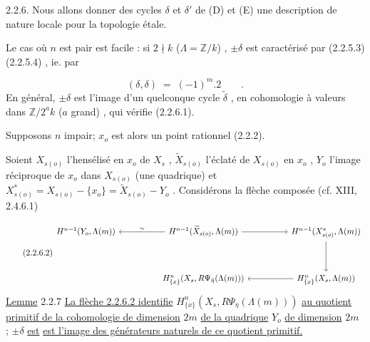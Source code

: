2.2.6. Nous allons donner des cycles  $\delta$  et  $\delta'$  de  (D) et (E) une description de nature locale pour la topologie étale.

Le cas où  $n$  est pair est facile : si  $2 \nmid k$  ($\Lambda = \mathbb{Z}/k$)  ,  $\pm \delta$  est caractérisé par (2.2.5.3) (2.2.5.4) , ie. par

\begin{equation}\tag{2.2.6.1}
(\delta,\delta) \;=\; (-1)^{m}.2 \qquad .
\end{equation}
En général,  $\pm \delta$  est l'image d'un quelconque cycle  $\widetilde{\delta}$ , en cohomologie à valeurs dans  $\mathbb{Z}/2^{a}k$  ($a$  grand) , qui vérifie (2.2.6.1).

Supposons  $n$  impair; $x_o$  est alors un point rationnel (2.2.2).

Soient  $X_{s(o)}$  l'hensélisé en  $x_o$  de  $X_s$ ,  $\widetilde{X}_{s(o)}$  l'éclaté de  $X_{s(o)}$  en  $x_o$ ,  $Y_o$  l'image réciproque de  $x_o$  dans  $X_{s(o)}$  (une quadrique) et  $X^{*}_{s(o)} = X_{s(o)} - \{x_o\} = \widetilde{X}_{s(o)} - Y_o$ . Considérons la flèche composée  (cf. XIII, 2.4.6.1)

\begin{equation}\tag{2.2.6.2}
\begin{tikzcd}[column sep=huge, row sep=huge]
H^{n-1}(Y_o,\Lambda(m)) & H^{n-1}(\widetilde{X}_{s(o)},\Lambda(m)) \arrow[l,"\sim"'] \arrow[r] & H^{n-1}(X^{*}_{s(o)},\Lambda(m)) \arrow[d] \\
& H^{n}_{\{x\}}(X_s,R\Psi_{\bar{\eta}}(\Lambda(m))) & H^{n}_{\{x\}}(X_s,\Lambda(m)) \arrow[l]
\end{tikzcd}
\end{equation}
\underline{Lemme} 2.2.7  \underline{La flèche 2.2.6.2 identifie}  $H^{n}_{\{x\}}(X_s,R\Psi_{\bar{\eta}}(\Lambda(m)))$  \underline{au quotient primitif de la cohomologie de dimension}  $2m$  \underline{de la quadrique}  $Y_o$  \underline{de dimension}  $2m$  ;  $\pm \delta$  \underline{est}
\underline{est l'image des générateurs naturels de ce quotient primitif.}

